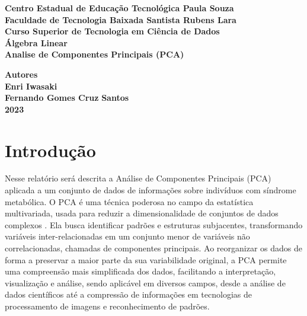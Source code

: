 \documentclass[12pt, a4paper]{article}
\begin{document}
\begin{titlepage}
\begin{center}
    \large
     {\bf Centro Estadual de Educação Tecnológica Paula Souza} \\
     {\bf Faculdade de Tecnologia Baixada Santista
Rubens Lara} \\ 
    {\bf Curso Superior de Tecnologia em Ciência de Dados} \\
    
    \vspace{215pt}
        {\bf Álgebra Linear} \\
    \vspace{10pt}
        {\Large \bf Analise de Componentes Principais (PCA)}\\
        
    \vspace{100pt}

    \vfill
        {\large  \bf Autores} \\
        {\large  \bf Enri Iwasaki} \\
        {\large  \bf Fernando Gomes Cruz} 
    \vfill
        \textbf{{\large Santos}\\
        {\large 2023}}
        
\end{center}
\end{titlepage}

\tableofcontents

\newpage

\section{Introdução}

Nesse relatório será descrita a Análise de Componentes Principais (PCA) aplicada a um conjunto de dados de informações sobre indivíduos com síndrome metabólica. O PCA é uma técnica poderosa no campo da estatística multivariada, usada para reduzir a dimensionalidade de conjuntos de dados complexos \autocite{jolliffe2016principal}. Ela busca identificar padrões e estruturas subjacentes, transformando variáveis inter-relacionadas em um conjunto menor de variáveis não correlacionadas, chamadas de componentes principais. Ao reorganizar os dados de forma a preservar a maior parte da sua variabilidade original, a PCA permite uma compreensão mais simplificada dos dados, facilitando a interpretação, visualização e análise, sendo aplicável em diversos campos, desde a análise de dados científicos até a compressão de informações em tecnologias de processamento de imagens e reconhecimento de padrões.
\end{document}
